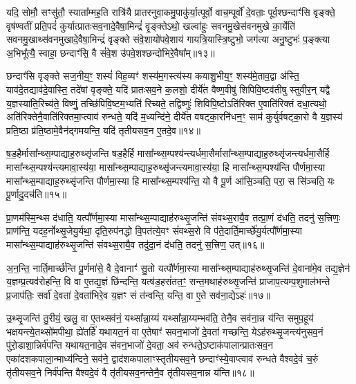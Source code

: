 {\anuvakamend[{आ॒दि॒त्यस्तस्यै॒व द्वे च॑॥४॥}]}

यदि॒ सोमौ॒ सꣳसु॑तौ॒ स्याता᳚म्मह॒ति रात्रि॑यै प्रातरनुवा॒कमु॒पाकु॑र्या॒त्पूर्वो॒ वाच॒म्पूर्वो॑ दे॒वताः॒ पूर्व॒श्छन्दाꣳ॑सि वृङ्क्ते॒ वृष॑ण्वतीं प्रति॒पदं॑ कुर्यात्प्रातःसव॒नादे॒वैषा॒मिन्द्रं॑ वृ॒ङ्क्ते\-ऽथो॒ खल्वा॑हुः सवनमु॒खेस॑वनमुखे का॒र्येति॑ सवनमु॒खाथ्स॑वनमुखादे॒वैषा॒मिन्द्रं॑ वृङ्क्ते संवे॒शायो॑पवे॒शाय॑ गायत्रि॒यास्त्रि॒ष्टुभो॒ जग॑त्या अनु॒ष्टुभः॑ प॒ङ्क्त्या अ॒भिभू᳚त्यै॒ स्वाहा॒ छन्दाꣳ॑सि॒ वै सं॑वे॒श उ॑पवे॒शश्छन्दो॑भिरे॒वैषा᳚म्॥१३॥

छन्दाꣳ॑सि वृङ्क्ते सज॒नीय॒ꣳ॒ शस्यं॑ विह॒व्यꣳ॑ शस्य॑म॒गस्त्य॑स्य कयाशु॒भीय॒ꣳ॒ शस्य॑मे॒ताव॒द्वा अ॑स्ति॒ याव॑दे॒तद्याव॑दे॒वास्ति॒ तदे॑षां वृङ्क्ते॒ यदि॑ प्रातःसव॒ने क॒लशो॒ दीर्ये॑त वैष्ण॒वीषु॑ शिपिवि॒ष्टव॑तीषु स्तुवीर॒न् यद्वै य॒ज्ञस्या॑ति॒रिच्य॑ते॒ विष्णुं॒ तच्छि॑पिवि॒ष्टम॒भ्यति॑ रिच्यते॒ तद्विष्णुः॑ शिविपि॒ष्टो\-ऽति॑रिक्त ए॒वाति॑रिक्तं दधा॒त्यथो॒ अति॑रिक्तेनै॒वाति॑रिक्तमा॒प्त्वाव॑ रुन्धते॒ यदि॑ म॒ध्यन्दि॑ने॒ दीर्ये॑त वषट्का॒रनि॑धन॒ꣳ॒ साम॑ कुर्युर्वषट्का॒रो वै य॒ज्ञस्य॑ प्रति॒ष्ठा प्र॑ति॒ष्ठामे॒वैन॑द्गमयन्ति॒ यदि॑ तृतीयसव॒न ए॒तदे॒व॥१४॥


{\anuvakamend[{छन्दो॑भिरे॒वैषा॒मवैका॒न्नविꣳ॑श॒तिश्च॑॥५॥}]}

ष॒ड॒हैर्मासा᳚न्थ्स॒म्पाद्याह॒रुथ्सृ॑जन्ति षड॒हैर्\mbox{}हि मासा᳚न्थ्स॒म्पश्य॑न्त्यर्धमा॒सैर्मासा᳚न्थ्स॒म्पाद्याह॒रुथ्सृ॑जन्त्यर्धमा॒सैर्\mbox{}हि मासा᳚न्थ्स॒म्पश्य॑न्त्यमावा॒स्य॑या॒ मासा᳚न्थ्स॒म्पाद्याह॒रुथ्सृ॑जन्त्यमावा॒स्य॑या॒ हि मासा᳚न्थ्स॒म्पश्य॑न्ति पौर्णमा॒स्या मासा᳚न्थ्स॒म्पाद्याह॒रुथ्सृ॑जन्ति पौर्णमा॒स्या हि मासा᳚न्थ्स॒म्पश्य॑न्ति॒ यो वै पू॒र्ण आ॑सि॒ञ्चति॒ परा॒ स सि॑ञ्चति॒ यः पू॒र्णादु॒दच॑ति॥१५॥

प्रा॒णम॑स्मि॒न्थ्स द॑धाति॒ यत्पौ᳚र्णमा॒स्या मासा᳚न्थ्स॒म्पाद्याह॑रुथ्सृ॒जन्ति॑ संवथ्स॒रायै॒व तत्प्रा॒णं द॑धति॒ तदनु॑ स॒त्त्रिणः॒ प्राण॑न्ति॒ यदह॒र्नोथ्सृ॒जेयु॒र्यथा॒ दृति॒रुप॑नद्धो वि॒पत॑त्ये॒वꣳ सं॑वथ्स॒रो वि प॑ते॒दार्ति॒मार्च्छे॑यु॒र्यत्पौ᳚र्णमा॒स्या मासा᳚न्थ्स॒म्पाद्याह॑रुथ्सृ॒जन्ति॑ संवथ्स॒रायै॒व तदु॑दा॒नं द॑धति॒ तदनु॑ स॒त्त्रिण॒ उत्॥१६॥

अ॒न॒न्ति॒ नार्ति॒मार्च्छ॑न्ति पू॒र्णमा॑से॒ वै दे॒वानाꣳ॑ सु॒तो यत्पौ᳚र्णमा॒स्या मासा᳚न्थ्स॒म्पाद्याह॑रुथ्सृ॒जन्ति॑ दे॒वाना॑मे॒व तद्य॒ज्ञेन॑ य॒ज्ञम्प्र॒त्यव॑रोहन्ति॒ वि वा ए॒तद्य॒ज्ञं छि॑न्दन्ति॒ यत्ष॑ड॒हसं॑तत॒ꣳ॒ सन्त॒मथाह॑रुथ्सृ॒जन्ति॑ प्राजाप॒त्यम्प॒शुमाल॑भन्ते प्र॒जाप॑तिः॒ सर्वा॑ दे॒वता॑ दे॒वता॑भिरे॒व य॒ज्ञꣳ सं त॑न्वन्ति॒ यन्ति॒ वा ए॒ते सव॑ना॒द्ये\-ऽहः॑॥१७॥

उ॒थ्सृ॒जन्ति॑ तु॒रीयं॒ खलु॒ वा ए॒तथ्सव॑नं॒ यथ्सा᳚न्ना॒य्यं यथ्सा᳚न्ना॒य्यम्भव॑ति॒ तेनै॒व सव॑ना॒न्न य॑न्ति समुप॒हूय॑ भक्षयन्त्ये॒तथ्सो॑मपीथा॒ ह्ये॑तर्\mbox{}हि॑ यथायत॒नं वा ए॒तेषाꣳ॑ सवन॒भाजो॑ दे॒वता॑ गच्छन्ति॒ ये\-ऽह॑रुथ्सृ॒जन्त्य॑नुसव॒नं पु॑रो॒डाशा॒न्निर्व॑पन्ति यथायत॒नादे॒व स॑वन॒भाजो॑ दे॒वता॒ अव॑ रुन्धते॒\-ऽष्टाक॑पालान्प्रातःसव॒न एका॑दशकपाला॒\-न्माध्य॑न्दिने॒ सव॑ने॒ द्वाद॑शकपालाꣳस्तृतीयसव॒ने छन्दाꣳ॑स्ये॒वाप्त्वाव॑ रुन्धते वैश्वदे॒वं च॒रुं तृ॑तीयसव॒ने निर्व॑पन्ति वैश्वदे॒वं वै तृ॑तीयसव॒नन्तेनै॒व तृ॑तीयसव॒नान्न य॑न्ति॥१८॥

